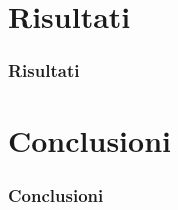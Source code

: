 \documentclass[c]{beamer}
\begin{document}

\section{Risultati}
\begin{frame}
\frametitle{Risultati}

\end{frame}



\section{Conclusioni}
\begin{frame}
\frametitle{Conclusioni}

\end{frame}

\end{document}
